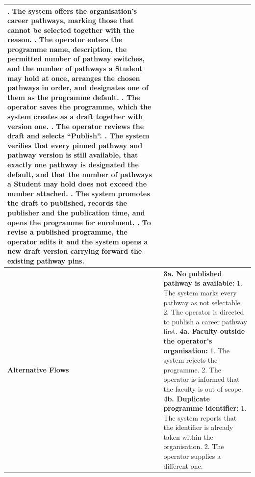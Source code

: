 \begin{longtable}{|>{\raggedright\arraybackslash}p{}|>{\raggedright\arraybackslash}p{}|}
3. The system offers the organisation's career pathways, marking those that cannot be selected together with the reason. \newline
4. The operator enters the programme name, description, the permitted number of pathway switches, and the number of pathways a Student may hold at once, arranges the chosen pathways in order, and designates one of them as the programme default. \newline
5. The operator saves the programme, which the system creates as a draft together with version one. \newline
6. The operator reviews the draft and selects ``Publish''. \newline
7. The system verifies that every pinned pathway and pathway version is still available, that exactly one pathway is designated the default, and that the number of pathways a Student may hold does not exceed the number attached. \newline
8. The system promotes the draft to published, records the publisher and the publication time, and opens the programme for enrolment. \newline
9. To revise a published programme, the operator edits it and the system opens a new draft version carrying forward the existing pathway pins. \\ \hline
\textbf{Alternative Flows} &
\textbf{3a. No published pathway is available:} \newline
\hspace*{1em}1. The system marks every pathway as not selectable. \newline
\hspace*{1em}2. The operator is directed to publish a career pathway first. \newline
\textbf{4a. Faculty outside the operator's organisation:} \newline
\hspace*{1em}1. The system rejects the programme. \newline
\hspace*{1em}2. The operator is informed that the faculty is out of scope. \newline
\textbf{4b. Duplicate programme identifier:} \newline
\hspace*{1em}1. The system reports that the identifier is already taken within the organisation. \newline
\hspace*{1em}2. The operator supplies a different one. \newline

\end{longtable}
